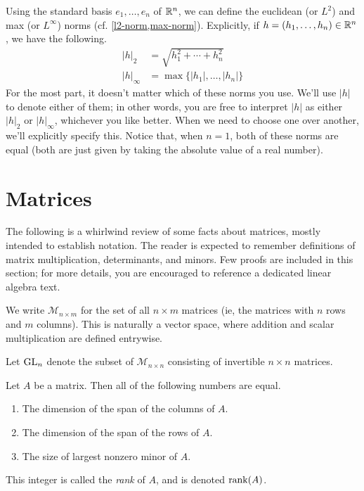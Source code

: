 Using the standard basis $e_1, \dotsc, e_n$ of $\mathbb{R}^n$, we can define the euclidean (or $L^2$) and max (or $L^\infty$) norms (cf. \cref{l2-norm,max-norm}). Explicitly, if $h = (h_1, \dotsc, h_n) \in \mathbb{R}^n$, we have the following.  
\[ \begin{aligned} 
|h|_2 &= \sqrt{h_1^2 + \dotsb + h_n^2} \\
|h|_\infty &= \max\{ |h_1|, \dotsc, |h_n| \}
\end{aligned} \]
For the most  part, it doesn't matter which of these norms you use. We'll use $|h|$ to denote either of them; in other words, you are free to interpret $|h|$ as either $|h|_2$ or $|h|_\infty$, whichever you like better. When we need to choose one over another, we'll explicitly specify this. Notice that, when $n = 1$, both of these norms are equal (both are just given by taking the absolute value of a real number). 

\section{Matrices}

The following is a whirlwind review of some facts about matrices, mostly intended to establish notation. The reader is expected to remember definitions of matrix multiplication, determinants, and minors. Few proofs are included in this section; for more details, you are encouraged to reference a dedicated linear algebra text.

\begin{definition} 
	We write $\mathscr{M}_{n \times m}$ for the set of all $n \times m$ matrices (ie, the matrices with $n$ rows and $m$ columns). This is naturally a vector space, where addition and scalar multiplication are defined entrywise.  
\end{definition}

\begin{definition} 
	Let $\operatorname{GL}_n$ denote the subset of $\mathscr{M}_{n \times n}$ consisting of invertible $n \times n$ matrices.
\end{definition}

\begin{lemma}
	Let $A$ be a matrix. Then all of the following numbers are equal. 
	\begin{enumerate}[(1)]
		\item The dimension of the span of the columns of $A$. \item The dimension of the span of the rows of $A$. 
		\item The size of largest nonzero minor of $A$. 
	\end{enumerate}
	This integer is called the \emph{rank} of $A$, and is denoted $\operatorname{rank}(A)$. 
\end{lemma}

